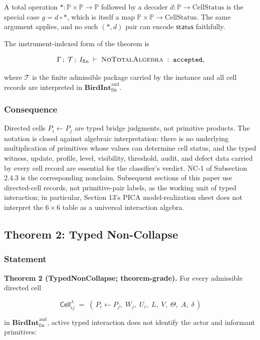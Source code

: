\documentclass[11pt]{article}
\theoremstyle{definition}
\begin{document}
A total operation \(*\colon\mathbb P\times\mathbb P\to\mathbb P\) followed by a decoder \(d\colon\mathbb P\to\mathrm{CellStatus}\) is the special case \(g=d\circ *\), which is itself a map \(\mathbb P\times\mathbb P\to\mathrm{CellStatus}\). The same argument applies, and no such \((*,d)\) pair can encode \(\mathsf{status}\) faithfully.

The instrument-indexed form of the theorem is

\[
\Gamma\,;\;\mathcal T\,;\;I_{\mathrm{fin}}\;\vdash\;\textsc{NoTotalAlgebra}\;:\;\texttt{accepted},
\]

where \(\mathcal T\) is the finite admissible package carried by the instance and all cell records are interpreted in \(\mathbf{BirdInt}^{\mathrm{aud}}_{\mathrm{fin}}\).

\subsubsection{Consequence}

Directed cells \(P_i\leftarrow P_j\) are typed bridge judgments, not primitive products. The notation is closed against algebraic interpretation: there is no underlying multiplication of primitives whose values can determine cell status, and the typed witness, update, profile, level, visibility, threshold, audit, and defect data carried by every cell record are essential for the classifier's verdict. NC-1 of Subsection 2.4.3 is the corresponding nonclaim. Subsequent sections of this paper use directed-cell records, not primitive-pair labels, as the working unit of typed interaction; in particular, Section 13's PICA model-realization sheet does not interpret the \(6\times 6\) table as a universal interaction algebra.

\subsection{Theorem 2: Typed Non-Collapse}

\subsubsection{Statement}

\textbf{Theorem 2 (TypedNonCollapse; theorem-grade).} For every admissible directed cell

\[
\mathsf{Cell}_{ij}^{\lambda}\;=\;(\,P_i\leftarrow P_j,\;W_j,\;U_i,\;L,\;V,\;\Theta,\;A,\;\delta\,)
\]

in \(\mathbf{BirdInt}^{\mathrm{aud}}_{\mathrm{fin}}\), active typed interaction does not identify the actor and informant primitives:
\end{document}
